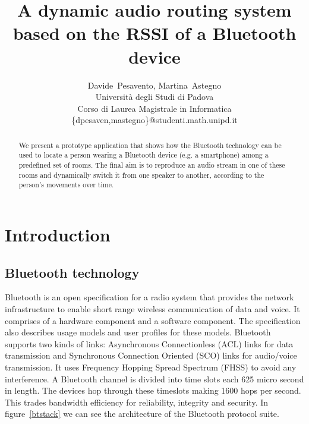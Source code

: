 \documentclass[conference]{IEEEtran}
\title{A dynamic audio routing system\\based on the RSSI of a Bluetooth device}%
\author{Davide~Pesavento, Martina~Astegno \\
	Università degli Studi di Padova \\
	Corso di Laurea Magistrale in Informatica \\
	\{dpesaven,mastegno\}@studenti.math.unipd.it
}
\begin{document}
\maketitle

\begin{abstract}
We present a prototype application that shows how the Bluetooth technology can be used to locate a person wearing a Bluetooth device (e.g. a smartphone) among a predefined set of rooms. The final aim is to reproduce an audio stream in one of these rooms and dynamically switch it from one speaker to another, according to the person's movements over time.
\end{abstract}



\section{Introduction}

\subsection{Bluetooth technology}
Bluetooth is an open specification for a radio system that provides the network infrastructure to enable short range wireless communication of data and voice. It comprises of a hardware component and a software component. The specification also describes usage models and user profiles for these models.
Bluetooth supports two kinds of links: Asynchronous Connectionless (ACL) links for data transmission and Synchronous Connection Oriented (SCO) links for audio/voice transmission. It uses Frequency Hopping Spread Spectrum (FHSS) to avoid any interference. A Bluetooth channel is divided into time slots each 625 micro second in length. The devices hop through these timeslots making 1600 hops per second. This trades bandwidth efficiency for reliability, integrity and security.
In figure~\ref{btstack} we can see the architecture of the Bluetooth protocol suite.
\end{document}
